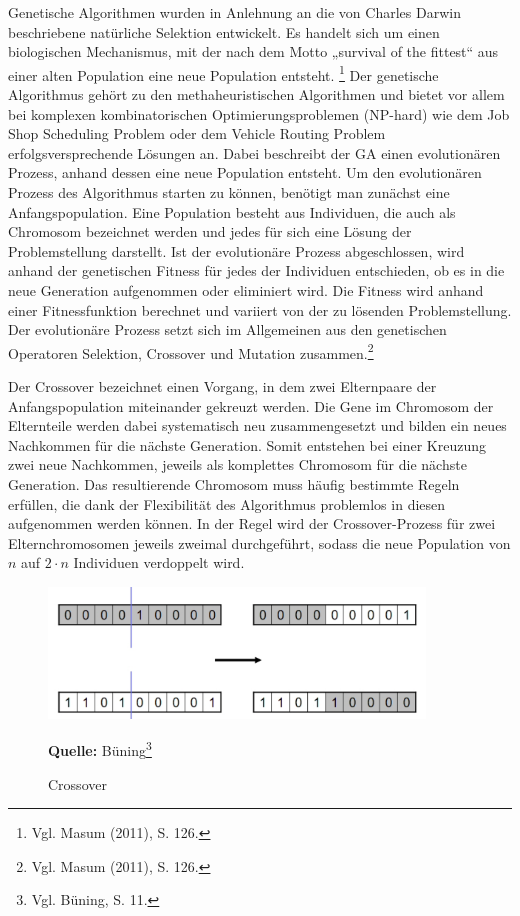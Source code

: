 \documentclass[a4paper,12pt,parskip,bibtotoc,liststotoc]{article}
\begin{document}
Genetische Algorithmen wurden in Anlehnung an die von Charles Darwin beschriebene natürliche Selektion entwickelt. Es handelt sich um einen biologischen Mechanismus, mit der nach dem Motto „survival of the fittest“ aus einer alten Population eine neue Population entsteht. \footnote{Vgl. Masum (2011), S. 126.}
Der genetische Algorithmus gehört zu den methaheuristischen Algorithmen und bietet vor allem bei komplexen kombinatorischen Optimierungsproblemen (NP-hard) wie dem Job Shop Scheduling Problem oder dem Vehicle Routing Problem erfolgsversprechende Lösungen an. 
Dabei beschreibt der GA einen evolutionären Prozess, anhand dessen eine neue Population entsteht.
Um den evolutionären Prozess des Algorithmus starten zu können, benötigt man zunächst eine Anfangspopulation. 
Eine Population besteht aus Individuen, die auch als Chromosom bezeichnet werden und jedes für sich eine Lösung der Problemstellung darstellt.
Ist der evolutionäre Prozess abgeschlossen, wird anhand der genetischen Fitness für jedes der Individuen entschieden, ob es in die neue Generation aufgenommen oder eliminiert wird. 
Die Fitness wird anhand einer Fitnessfunktion berechnet und variiert von der zu lösenden Problemstellung.
Der evolutionäre Prozess setzt sich im Allgemeinen aus den genetischen Operatoren Selektion, Crossover und Mutation zusammen.\footnote{Vgl. Masum (2011), S. 126.}
 
Der Crossover bezeichnet einen Vorgang, in dem zwei Elternpaare der Anfangspopulation miteinander gekreuzt werden. 
Die Gene im Chromosom der Elternteile werden dabei systematisch neu zusammengesetzt und bilden ein neues Nachkommen für die nächste Generation.
Somit entstehen bei einer Kreuzung zwei neue Nachkommen, jeweils als komplettes Chromosom für die nächste Generation. 
Das resultierende Chromosom muss häufig bestimmte Regeln erfüllen, die dank der Flexibilität des Algorithmus problemlos in diesen aufgenommen werden können.
In der Regel wird der Crossover-Prozess für zwei Elternchromosomen jeweils zweimal durchgeführt, sodass die neue Population von $n$ auf $2\cdot n$ Individuen verdoppelt wird.


\begin{figure}[h!]
  \begin{center}
    \includegraphics[width=100mm]{crossover.png}
    \caption{Crossover}  \label{Typen}
    {\footnotesize \textbf{Quelle:} Büning\footnote{Vgl. Büning, S. 11.}}
  \end{center}
\end{figure}
\end{document}
